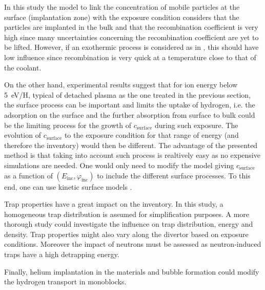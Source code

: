 In this study the model to link the concentration of mobile particles at the surface (implantation zone) with the exposure condition considers that the particles are implanted in the bulk and that the recombination coefficient is very high since many uncertainties concerning the recombination coefficient are yet to be lifted.
However, if an exothermic process is considered as in , this should have low influence since recombination is very quick at a temperature close to that of the coolant.

On the other hand, experimental results  suggest that for ion energy below \SI{5}{eV/H}, typical of detached plasma as the one treated in the previous section, the surface process can be important and limits the uptake of hydrogen, i.e. the adsorption on the surface and the further absorption from surface to bulk could be the limiting process for the growth of $c_\mathrm{surface}$ during such exposure.
The evolution of $c_\mathrm{surface}$ to the exposure condition for that range of energy (and therefore the inventory) would then be different.
The advantage of the presented method is that taking into account such process is realtively easy as no expensive simulations are needed.
One would only need to modify the model giving $c_\mathrm{surface}$
as a function of $(E_\mathrm{inc},\varphi_\mathrm{inc})$ to include the different surface processes.
To this end, one can use kinetic surface models .

Trap properties have a great impact on the inventory.
In this study, a homogeneous trap distribution is assumed for simplification purposes.
A more thorough study could investigate the influence on trap distribution, energy and density.
Trap properties might also vary along the divertor based on exposure conditions.
Moreover the impact of neutrons must be assessed as neutron-induced traps have a high detrapping energy.



Finally, helium implantation in the materials and bubble formation could modify the hydrogen transport in monoblocks.

